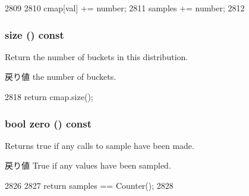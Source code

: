 \begin{DoxyCode}
2809     {
2810         cmap[val] += number;
2811         samples += number;
2812     }
\end{DoxyCode}
\hypertarget{classStats_1_1SparseHistStor_a503ab01f6c0142145d3434f6924714e7}{
\subsubsection[{size}]{ size () const}}
\label{classStats_1_1SparseHistStor_a503ab01f6c0142145d3434f6924714e7}
Return the number of buckets in this distribution. \begin{DoxyReturn}{戻り値}
the number of buckets. 
\end{DoxyReturn}



\begin{DoxyCode}
2818 { return cmap.size(); }
\end{DoxyCode}
\hypertarget{classStats_1_1SparseHistStor_a4e72b01b727d3165e75cba84eb507491}{
\subsubsection[{zero}]{\setlength{\rightskip}{0pt plus 5cm}bool zero () const}}
\label{classStats_1_1SparseHistStor_a4e72b01b727d3165e75cba84eb507491}
Returns true if any calls to sample have been made. \begin{DoxyReturn}{戻り値}
True if any values have been sampled. 
\end{DoxyReturn}



\begin{DoxyCode}
2826     {
2827         return samples == Counter();
2828     }
\end{DoxyCode}


